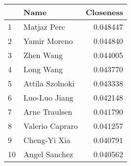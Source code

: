 \begin{tabular}{llr}
\toprule
{} &             Name &  Closeness \\
\midrule
1  &      Matjaz Perc &   0.048447 \\
2  &     Yamir Moreno &   0.044840 \\
3  &        Zhen Wang &   0.044005 \\
4  &        Long Wang &   0.043770 \\
5  &  Attila Szolnoki &   0.043338 \\
6  &    Luo-Luo Jiang &   0.042148 \\
7  &    Arne Traulsen &   0.041790 \\
8  &  Valerio Capraro &   0.041257 \\
9  &     Cheng-Yi Xia &   0.040791 \\
10 &    Angel Sanchez &   0.040562 \\
\bottomrule
\end{tabular}
